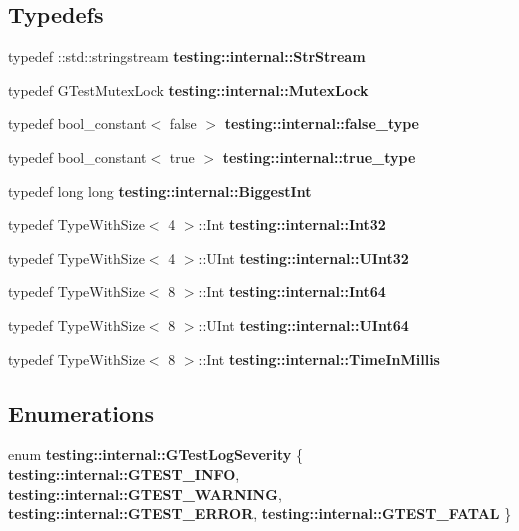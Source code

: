 \subsection*{Typedefs}
\begin{CompactItemize}
\item 
typedef ::std::stringstream {\bf testing::internal::StrStream}
\item 
typedef GTestMutexLock {\bf testing::internal::MutexLock}
\item 
typedef bool\_\-constant$<$ false $>$ {\bf testing::internal::false\_\-type}
\item 
typedef bool\_\-constant$<$ true $>$ {\bf testing::internal::true\_\-type}
\item 
typedef long long {\bf testing::internal::BiggestInt}
\item 
typedef TypeWithSize$<$ 4 $>$::Int {\bf testing::internal::Int32}
\item 
typedef TypeWithSize$<$ 4 $>$::UInt {\bf testing::internal::UInt32}
\item 
typedef TypeWithSize$<$ 8 $>$::Int {\bf testing::internal::Int64}
\item 
typedef TypeWithSize$<$ 8 $>$::UInt {\bf testing::internal::UInt64}
\item 
typedef TypeWithSize$<$ 8 $>$::Int {\bf testing::internal::TimeInMillis}
\end{CompactItemize}
\subsection*{Enumerations}
\begin{CompactItemize}
\item 
enum {\bf testing::internal::GTestLogSeverity} \{ {\bf testing::internal::GTEST\_\-INFO}, 
{\bf testing::internal::GTEST\_\-WARNING}, 
{\bf testing::internal::GTEST\_\-ERROR}, 
{\bf testing::internal::GTEST\_\-FATAL}
 \}
\end{CompactItemize}
